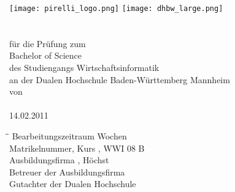 \thispagestyle{plain}
\begin{titlepage}

\begin{center}
\texttt{[image: pirelli\_logo.png]}
\hspace{85mm}
\texttt{[image: dhbw\_large.png]}
\\[7ex]




\huge{\textsc{\textbf{\titel}}}\\[4.5ex]
\large{\textbf{\art}}\\[1ex]
\large{für die Prüfung zum}\\[1ex]
\large{Bachelor of Science}\\[5ex]
\large{des Studiengangs Wirtschaftsinformatik}\\[1ex]
\large{an der Dualen Hochschule Baden-Württemberg Mannheim}\\[5ex]

von\\[1ex]
\autor\\[7ex]


14.02.2011\\[10ex]

\normalsize
\begin{tabbing}
\hspace*{8cm}\=\hspace{8cm}\=\kill
Bearbeitungszeitraum  Wochen\\
Matrikelnummer, Kurs \>\matrikelnr, WWI 08 B\\
Ausbildungsfirma \>\firmenname, Höchst\\
Betreuer der Ausbildungsfirma \>\zweitgutachter\\
Gutachter der Dualen Hochschule \>\erstgutachter\\
\end{tabbing}
\end{center}
\end{titlepage}
